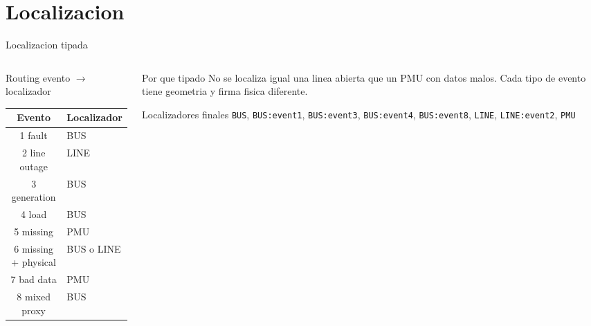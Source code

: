 \documentclass[10pt,aspectratio=169]{beamer}
\newcommand{\code}[1]{\texttt{\footnotesize #1}}
\begin{document}
\section{Localizacion}

\begin{frame}{Localizacion tipada}
\small
\begin{columns}[T,totalwidth=\textwidth]
\begin{column}{0.48\textwidth}
\begin{block}{Routing evento $\rightarrow$ localizador}
\begin{tabular}{cl}
\toprule
Evento & Localizador\\
\midrule
1 fault & BUS\\
2 line outage & LINE\\
3 generation & BUS\\
4 load & BUS\\
5 missing & PMU\\
6 missing + physical & BUS o LINE\\
7 bad data & PMU\\
8 mixed proxy & BUS\\
\bottomrule
\end{tabular}
\end{block}
\end{column}
\begin{column}{0.48\textwidth}
\begin{exampleblock}{Por que tipado}
No se localiza igual una linea abierta que un PMU con datos malos. Cada tipo de evento tiene geometria y firma fisica diferente.
\end{exampleblock}
\begin{alertblock}{Localizadores finales}
\code{BUS}, \code{BUS:event1}, \code{BUS:event3}, \code{BUS:event4}, \code{BUS:event8}, \code{LINE}, \code{LINE:event2}, \code{PMU}
\end{alertblock}
\end{column}
\end{columns}
\end{frame}
\end{document}
